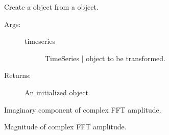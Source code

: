 \documentclass[letterpaper,10pt,english,openany,oneside]{sphinxmanual}
\begin{document}
\begin{fulllineitems}
\begin{fulllineitems}
\begin{description}
\begin{description}
\begin{description}
\end{description}

\end{description}

\end{description}

\end{fulllineitems}


\begin{fulllineitems}
\label{\detokenize{index:sigpropy.FourierTransform.from_timeseries}}
Create a  object from a 
object.
\begin{description}
\item[{Args:}] \leavevmode\begin{description}
\item[{timeseries}] \leavevmode{[}TimeSeries {]}
 object to be transformed.

\end{description}

\item[{Returns:}] \leavevmode
An initialized  object.

\end{description}

\end{fulllineitems}


\begin{fulllineitems}
\label{\detokenize{index:sigpropy.FourierTransform.imag}}
Imaginary component of complex FFT amplitude.

\end{fulllineitems}


\begin{fulllineitems}
\label{\detokenize{index:sigpropy.FourierTransform.mag}}
Magnitude of complex FFT amplitude.


\end{fulllineitems}
\end{fulllineitems}
\end{document}
